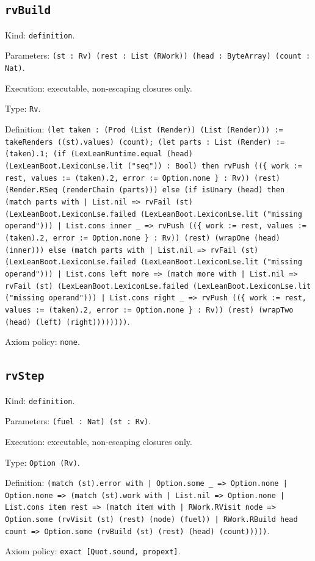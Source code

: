 \documentclass[11pt]{article}
\begin{document}
\subsection*{\texttt{rvBuild}}
\noindent Kind: \texttt{definition}.\par
\noindent Parameters: \texttt{(st : Rv) (rest : List (RWork)) (head : ByteArray) (count : Nat)}.\par
\noindent Execution: executable, non-escaping closures only.\par
\noindent Type: \texttt{Rv}.\par
\noindent Definition: \texttt{(let taken : (Prod (List (Render)) (List (Render))) := takeRenders ((st).values) (count); (let parts : List (Render) := (taken).1; (if (LexLeanRuntime.equal (head) (LexLeanBoot.LexiconLse.lit ("seq")) : Bool) then rvPush ((\{ work := rest, values := (taken).2, error := Option.none \} : Rv)) (rest) (Render.RSeq (renderChain (parts))) else (if isUnary (head) then (match parts with | List.nil => rvFail (st) (LexLeanBoot.LexiconLse.failed (LexLeanBoot.LexiconLse.lit ("missing operand"))) | List.cons inner \_ => rvPush ((\{ work := rest, values := (taken).2, error := Option.none \} : Rv)) (rest) (wrapOne (head) (inner))) else (match parts with | List.nil => rvFail (st) (LexLeanBoot.LexiconLse.failed (LexLeanBoot.LexiconLse.lit ("missing operand"))) | List.cons left more => (match more with | List.nil => rvFail (st) (LexLeanBoot.LexiconLse.failed (LexLeanBoot.LexiconLse.lit ("missing operand"))) | List.cons right \_ => rvPush ((\{ work := rest, values := (taken).2, error := Option.none \} : Rv)) (rest) (wrapTwo (head) (left) (right))))))))}.\par
\noindent Axiom policy: \texttt{none}.\par
\subsection*{\texttt{rvStep}}
\noindent Kind: \texttt{definition}.\par
\noindent Parameters: \texttt{(fuel : Nat) (st : Rv)}.\par
\noindent Execution: executable, non-escaping closures only.\par
\noindent Type: \texttt{Option (Rv)}.\par
\noindent Definition: \texttt{(match (st).error with | Option.some \_ => Option.none | Option.none => (match (st).work with | List.nil => Option.none | List.cons item rest => (match item with | RWork.RVisit node => Option.some (rvVisit (st) (rest) (node) (fuel)) | RWork.RBuild head count => Option.some (rvBuild (st) (rest) (head) (count)))))}.\par
\noindent Axiom policy: \texttt{exact [Quot.sound, propext]}.\par
\end{document}
